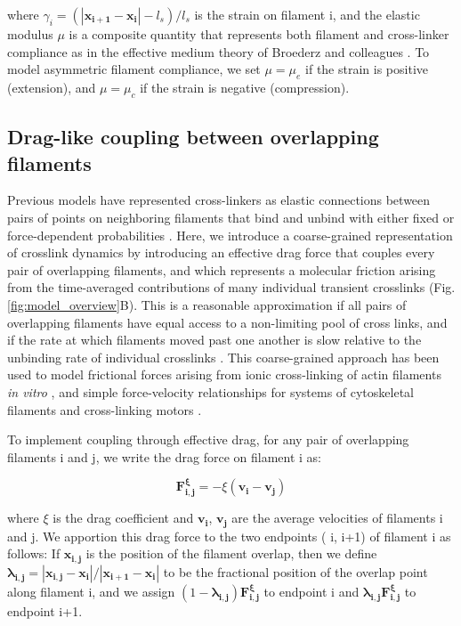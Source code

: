 \documentclass[10pt,letterpaper]{article}
\begin{document}
where $ \gamma_{i} = (|\mathbf{x_{i+1}}-\mathbf{x_i}|-l_s)/l_s$ is the strain on filament i, and the elastic modulus  $\mu$ is a composite quantity that represents both filament and cross-linker compliance as in the effective medium theory of Broederz and colleagues \cite{theo_crosslinknonlinear}.  To model asymmetric filament compliance, we set $\mu = \mu_e$ if the strain is positive (extension), and $\mu = \mu_c$ if the strain is negative (compression). 


\subsection*{Drag-like coupling between overlapping filaments}
\label{exp_drag}
Previous models have represented cross-linkers as elastic connections between pairs of points on neighboring filaments that bind and unbind with either fixed or force-dependent probabilities \cite{model_taeyoon,theo_crosslinknonlinear}.  Here, we introduce a coarse-grained representation of crosslink dynamics by introducing an effective drag force that couples every pair of overlapping filaments, and which represents a molecular friction arising from the time-averaged contributions of many individual transient crosslinks (Fig. \ref{fig:model_overview}B). This is a reasonable approximation if all pairs of overlapping filaments have equal access to a non-limiting pool of cross links, and if the rate at which filaments moved past one another is slow relative to the unbinding rate of individual crosslinks \cite{howard2001mechanics}. This coarse-grained approach has been used to model frictional forces arising from ionic cross-linking of actin filaments {\em in vitro} \cite{mol_fric,theo_hydroish2}, and simple force-velocity relationships for systems of cytoskeletal filaments and cross-linking motors \cite{theo_frictionShila, Schoenberg1985, tawada1991, leibler1993}.

To implement coupling through effective drag, for any pair of overlapping filaments i and j, we write the drag force on filament i as:

\begin{equation}
\label{eqn:drag force}
\mathbf{F^{\xi}_{i,j}} = -\xi  (\mathbf{v_{i}}-\mathbf{v_{j}}) 
\end{equation}

where $\xi$ is the drag coefficient and $\mathbf{v_{i}}$, $\mathbf{v_{j}}$ are the average velocities of filaments i and j. We apportion this drag force to the two endpoints ( i, i+1) of filament i as follows: If $\mathbf{x_{i,j}}$ is the position of the filament overlap, then we define $\mathbf{\lambda_{i,j}} = |\mathbf{x_{i,j}}-\mathbf{x_i}|/|\mathbf{x_{i+1}}-\mathbf{x_i}|$ to be the fractional position of the overlap point along filament i, and we assign $(1 - \mathbf{\lambda_{i,j}}) \mathbf{F^{\xi}_{i,j}}$ to endpoint i and $\mathbf{\lambda_{i,j}} \mathbf{F^{\xi}_{i,j}}$ to endpoint i+1.
\end{document}
